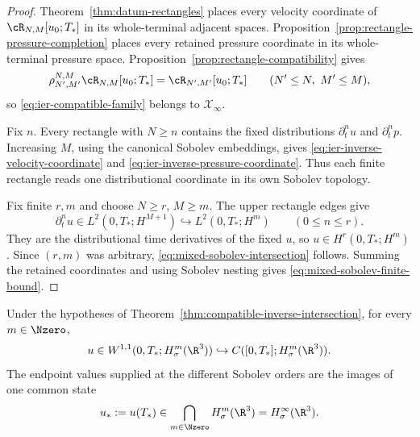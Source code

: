 \begin{proof}
Theorem~\ref{thm:datum-rectangles} places every velocity coordinate of
\(\cR_{N,M}[u_0;T_*]\) in its whole-terminal adjacent spaces.
Proposition~\ref{prop:rectangle-pressure-completion} places every retained
pressure coordinate in its whole-terminal pressure space.
Proposition~\ref{prop:rectangle-compatibility} gives
\[
 \rho_{N',M'}^{N,M}\cR_{N,M}[u_0;T_*]
 =\cR_{N',M'}[u_0;T_*]
 \qquad(N'\le N,\ M'\le M),
\]
so \eqref{eq:ier-compatible-family} belongs to \(\mathscr X_\infty\).

Fix \(n\).  Every rectangle with \(N\ge n\) contains the fixed distributions
\(\partial_t^nu\) and \(\partial_t^np\).  Increasing \(M\), using the
canonical Sobolev embeddings, gives
\eqref{eq:ier-inverse-velocity-coordinate} and
\eqref{eq:ier-inverse-pressure-coordinate}.  Thus each finite rectangle reads
one distributional coordinate in its own Sobolev topology.

Fix finite \(r,m\) and choose \(N\ge r\), \(M\ge m\).  The upper rectangle
edges give
\[
 \partial_t^nu\in L^2(0,T_*;H^{M+1})
 \hookrightarrow L^2(0,T_*;H^m)
 \qquad(0\le n\le r).
\]
They are the distributional time derivatives of the fixed \(u\), so
\(u\in H^r(0,T_*;H^m)\).  Since \((r,m)\) was arbitrary,
\eqref{eq:mixed-sobolev-intersection} follows.  Summing the retained
coordinates and using Sobolev nesting gives
\eqref{eq:mixed-sobolev-finite-bound}.
\end{proof}

\begin{proposition}
\label{prop:ier-complete-spatial-endpoint}
Under the hypotheses of
Theorem~\ref{thm:compatible-inverse-intersection}, for every
\(m\in\Nzero\),
\begin{equation}
 u\in W^{1,1}(0,T_*;H^m_\sigma(\R^3))
 \hookrightarrow C([0,T_*];H^m_\sigma(\R^3)).
 \label{eq:ier-spatial-row-W11}
\end{equation}
The endpoint values supplied at the different Sobolev orders are the images
of one common state
\begin{equation}
 u_*:=u(T_*)\in\bigcap_{m\in\Nzero}H^m_\sigma(\R^3)
 =H^\infty_\sigma(\R^3).
 \label{eq:ier-common-spatial-endpoint}
\end{equation}
\end{proposition}

